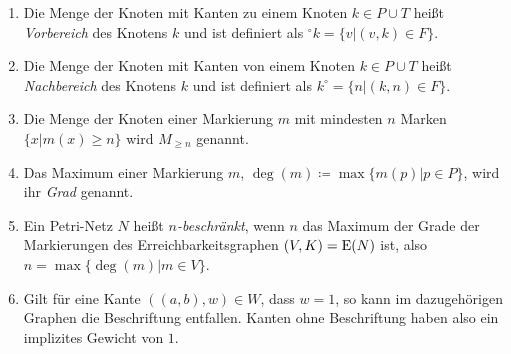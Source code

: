 \begin{enumerate}
	\item Die Menge der Knoten mit Kanten zu einem Knoten $k \in P\cup T$ heißt \emph{Vorbereich} des Knotens $k$ und ist definiert als $^\circ k = \{v | (v,k) \in F\}$.
	\item Die Menge der Knoten mit Kanten von einem Knoten $k \in P\cup T$ heißt \emph{Nachbereich} des Knotens $k$ und ist definiert als $k^\circ  = \{n | (k,n) \in F\}$.
	\item Die Menge der Knoten einer Markierung $m$ mit mindesten $n$ Marken $\{x | m(x)\geq n\}$ wird $M_{\geq n}$ genannt.
	\item Das Maximum einer Markierung $m$, $\deg(m) \coloneqq \max \{m(p)|p\in P\}$, wird ihr \emph{Grad} genannt.
	\item Ein Petri-Netz $N$ heißt \emph{$n$-beschränkt}, wenn $n$ das Maximum der Grade der Markierungen des Erreichbarkeitsgraphen $(V,K)=\operatorname{E}(N)$ ist, also $n = \max\{\deg(m)| m\in V \}$.
	\item Gilt für eine Kante $((a, b),w) \in W$, dass $w = 1$, so kann im dazugehörigen Graphen die Beschriftung entfallen. Kanten ohne Beschriftung haben also ein implizites Gewicht von $1$.
\end{enumerate}



